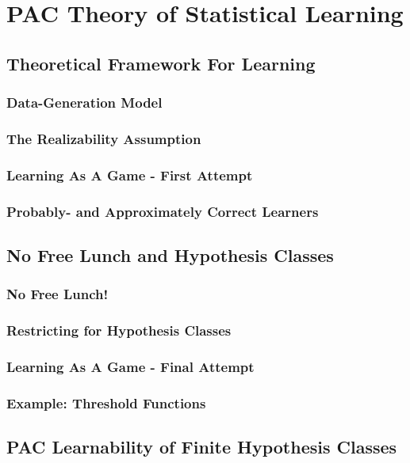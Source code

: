 \chapter{PAC Theory of Statistical Learning}
    \section{Theoretical Framework For Learning}
        \subsection{Data-Generation Model}
        \subsection{The Realizability Assumption}
        \subsection{Learning As A Game - First Attempt}
        \subsection{Probably- and Approximately Correct Learners}
    \section{No Free Lunch and Hypothesis Classes}
        \subsection{No Free Lunch!}
        \subsection{Restricting for Hypothesis Classes}
        \subsection{Learning As A Game - Final Attempt}
        \subsection{Example: Threshold Functions}
    
    \section{PAC Learnability of Finite Hypothesis Classes}
    
